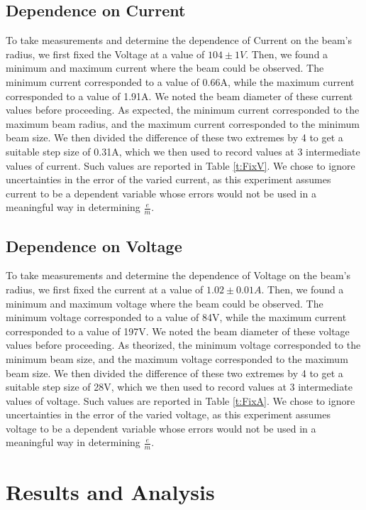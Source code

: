 \documentclass[12pt]{article}
\begin{document}
\subsection{Dependence on Current}
To take measurements and determine the dependence of Current on the beam's radius, we first fixed the Voltage at a value of $104\pm1V$. Then, we found a minimum and maximum current where the beam could be observed. The minimum current corresponded to a value of 0.66A, while the maximum current corresponded to a value of 1.91A. We noted the beam diameter of these current values before proceeding. As expected, the minimum current corresponded to the maximum beam radius, and the maximum current corresponded to the minimum beam size. We then divided the difference of these two extremes by 4 to get a suitable step size of 0.31A, which we then used to record values at 3 intermediate values of current. Such values are reported in Table \ref{t:FixV}. We chose to ignore uncertainties in the error of the varied current, as this experiment assumes current to be a dependent variable whose errors would not be used in a meaningful way in determining $\frac{e}{m}$.

\subsection{Dependence on Voltage}
To take measurements and determine the dependence of Voltage on the beam's radius, we first fixed the current at a value of $1.02\pm0.01A$. Then, we found a minimum and maximum voltage where the beam could be observed. The minimum voltage corresponded to a value of 84V, while the maximum current corresponded to a value of 197V. We noted the beam diameter of these voltage values before proceeding. As theorized, the minimum voltage corresponded to the minimum beam size, and the maximum voltage corresponded to the maximum beam size. We then divided the difference of these two extremes by 4 to get a suitable step size of 28V, which we then used to record values at 3 intermediate values of voltage. Such values are reported in Table \ref{t:FixA}. We chose to ignore uncertainties in the error of the varied voltage, as this experiment assumes voltage to be a dependent variable whose errors would not be used in a meaningful way in determining $\frac{e}{m}$.

\section{Results and Analysis}
\lipsum[4]
\end{document}
